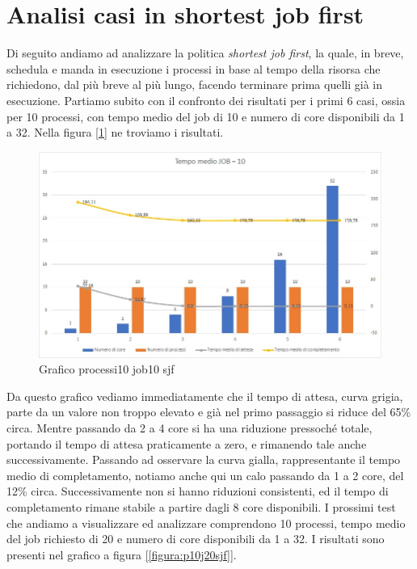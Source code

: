 \documentclass[Lau, oneside]{sapthesis}%
\begin{document}
\section{Analisi casi in shortest job first}
\label{sec:analisiSJF}
Di seguito andiamo ad analizzare la politica \textit{shortest job first}, la quale, in breve, schedula e manda in esecuzione i processi in base al tempo della risorsa che richiedono, dal più breve al più lungo, facendo terminare prima quelli già in esecuzione.
Partiamo subito con il confronto dei risultati per i primi 6 casi, ossia per 10 processi, con tempo medio del job di 10 e numero di core disponibili da 1 a 32.
Nella figura \hyperref[figura:p10j10sjf]{[\ref*{figura:p10j10sjf}]} ne troviamo i risultati.
\begin{figure}[ht!]
  \centering
  \includegraphics[width=1\textwidth]{Grafico processi10 job10 sjf.jpg}
  \caption{Grafico processi10 job10 sjf}
  \label{figura:p10j10sjf}
\end{figure}
Da questo grafico vediamo immediatamente che il tempo di attesa, curva grigia, parte da un valore non troppo elevato e già nel primo passaggio si riduce del 65\% circa.
Mentre passando da 2 a 4 core si ha una riduzione pressoché totale, portando il tempo di attesa praticamente a zero, e rimanendo tale anche successivamente.
Passando ad osservare la curva gialla, rappresentante il tempo medio di completamento, notiamo anche qui un calo passando da 1 a 2 core, del 12\% circa.
Successivamente non si hanno riduzioni consistenti, ed il tempo di completamento rimane stabile a partire dagli 8 core disponibili.
I prossimi test che andiamo a visualizzare ed analizzare comprendono 10 processi, tempo medio del job richiesto di 20 e numero di core disponibili da 1 a 32.
I risultati sono presenti nel grafico a figura \hyperref[figura:p10j20sjf]{[\ref*{figura:p10j20sjf}]}.
\end{document}
